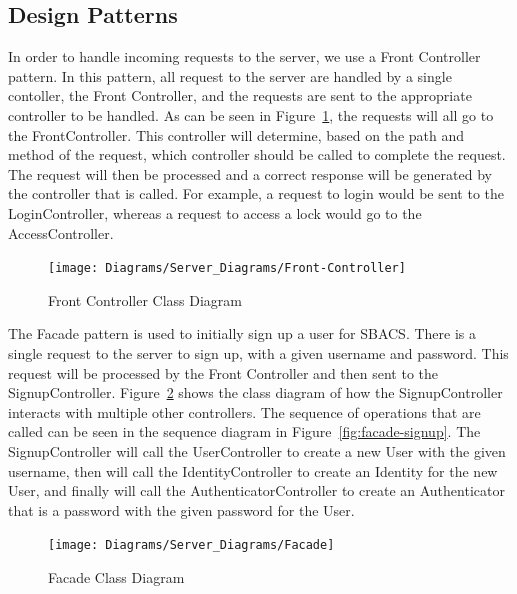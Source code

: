 \documentclass[12pt]{report}
\let\Oldsubsection\subsection
\renewcommand{\subsection}{\FloatBarrier\Oldsubsection}
\begin{document}
\subsection{Design Patterns} \label{design-patterns}
	


In order to handle incoming requests to the server, we use a Front Controller pattern. In this pattern,
all request to the server are handled by a single contoller, the Front Controller, and the requests
are sent to the appropriate controller to be handled. As can be seen in Figure~\ref{fig:front-controller},
the requests will all go to the FrontController. This controller will determine, based on the path and
method of the request, which controller should be called to complete the request. The request will then
be processed and a correct response will be generated by the controller that is called. For example,
a request to login would be sent to the LoginController, whereas a request to access a lock would go 
to the AccessController.

\begin{figure}
    \texttt{[image: Diagrams/Server\_Diagrams/Front-Controller]}
    \caption{Front Controller Class Diagram}
    \label{fig:front-controller}
\end{figure}

The Facade pattern is used to initially sign up a user for SBACS. There is a single request to the
server to sign up, with a given username and password. This request will be processed by the
Front Controller and then sent to the SignupController. Figure~\ref{fig:facade-server} shows the
class diagram of how the SignupController interacts with multiple other controllers. The sequence
of operations that are called can be seen in the sequence diagram in Figure~\ref{fig:facade-signup}.
The SignupController will call the UserController
to create a new User with the given username, then will call the IdentityController to create an Identity
for the new User, and finally will call the AuthenticatorController to create an Authenticator that is
a password with the given password for the User. 

\begin{figure}
    \texttt{[image: Diagrams/Server\_Diagrams/Facade]}
    \caption{Facade Class Diagram}
    \label{fig:facade-server}
\end{figure}
\end{document}
